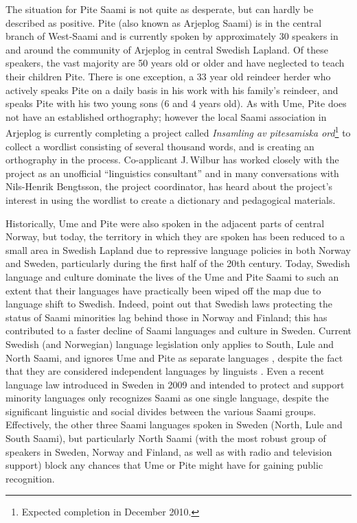 \documentclass[a4paper,12pt]{article}
\begin{document}
The situation for Pite Saami is not quite as desperate, but can hardly be described as positive. Pite (also known as Arjeplog Saami) is in the central branch of West-Saami and is currently spoken by approximately 30 speakers in and around the community of Arjeplog in central Swedish Lapland. Of these speakers, the vast majority are 50 years old or older and have neglected to teach their children Pite. There is one exception, a 33 year old reindeer herder who actively speaks Pite on a daily basis in his work with his family's reindeer, and speaks Pite with his two young sons (6 and 4 years old). As with Ume, Pite does not have an established orthography; however the local Saami association in Arjeplog is currently completing a project called \textit{Insamling av pitesamiska ord}\footnote{Expected completion in December 2010.} to collect a wordlist consisting of several thousand words, and is creating an orthography in the process. Co-applicant J.\,Wilbur has worked closely with the project as an unofficial “linguistics consultant” and in many conversations with Nils-Henrik Bengtsson, the project coordinator, has heard about the project's interest in using the wordlist to create a dictionary and pedagogical materials.

Historically, Ume and Pite were also spoken in the adjacent parts of central Norway, but today, the territory in which they are spoken has been reduced to a small area in Swedish Lapland due to repressive language policies in both Norway and Sweden, particularly during the first half of the 20th century. Today, Swedish language and culture dominate the lives of the Ume and Pite Saami to such an extent that their languages have practically been wiped off the map due to language shift to Swedish. Indeed, \citet[123]{blokland-etal2003} point out that Swedish laws protecting the status of Saami minorities lag behind those in Norway and Finland; this has contributed to a faster decline of Saami languages and culture in Sweden. Current Swedish (and Norwegian) language legislation only applies to South, Lule and North Saami, and ignores Ume and Pite as separate languages \cite[180]{kulonen-etal2005}, despite the fact that they are considered independent languages by linguists \citep[cf.][]{gordon 2005,sammallahti1998b}. Even a recent language law introduced in Sweden in 2009 and intended to protect and support minority languages only recognizes Saami as one single language, despite the significant linguistic and social divides between the various Saami groups. Effectively, the other three Saami languages spoken in Sweden (North, Lule and South Saami), but particularly North Saami (with the most robust group of speakers in Sweden, Norway and Finland, as well as with radio and television support) block any chances that Ume or Pite might have for gaining public recognition. 
\end{document}
